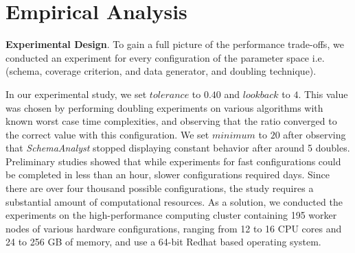 
\section{Empirical Analysis}

\textbf{Experimental Design}. To gain a full picture of the performance trade-offs, we conducted an experiment for every configuration
of the parameter space i.e. (schema, coverage criterion, and data generator, and doubling technique). 

In our experimental study, we set $\mathit{tolerance}$ to $0.40$ and
$\mathit{lookback}$ to $4$. This value was chosen by performing doubling
experiments on various algorithms with known worst case time complexities, and observing that the ratio converged to the
correct value with this configuration.  We set $\mathit{minimum}$ to $20$ after observing that
\textit{SchemaAnalyst} stopped displaying constant behavior after around 5 doubles.  Preliminary studies showed that
while experiments for fast configurations could be completed in less than an hour, slower configurations required days.
Since there are over four thousand possible configurations, the study requires a substantial amount of computational
resources.  As a solution, we conducted the experiments on the high-performance computing cluster containing 195 worker
nodes of various hardware configurations, ranging from 12 to 16 CPU cores and 24 to 256 GB of memory, and use a 64-bit
Redhat based operating system.
